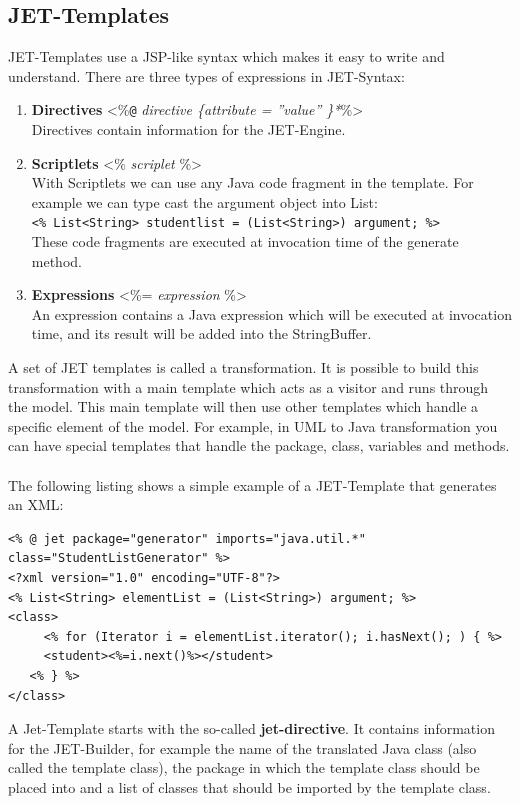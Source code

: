 \subsection{JET-Templates}
JET-Templates use a JSP-like syntax which makes it easy to write and understand. There are three types of expressions in JET-Syntax:
\begin{enumerate}
	\item \textbf{Directives} <\%\verb|@| \textit{directive \{attribute =  ''value''  \}*}\%>\\
	      Directives contain information for the JET-Engine. 
	      
	\item \textbf{Scriptlets} <\% \textit{scriplet} \%>\\
	      With Scriptlets we can use any Java code fragment in the template. 
	      For example we can type cast the argument object into List:\\ 
	      \verb|<% List<String> studentlist = (List<String>) argument; %>|\\
	      These code fragments are executed at invocation time of the generate method.
	      
	\item \textbf{Expressions} <\%= \textit{expression} \%>\\
	      An expression contains a Java expression which will be executed at invocation time, and its result will be added into the StringBuffer.
\end{enumerate}

A set of JET templates is called a transformation. It is possible to build this transformation with a main template which acts as a visitor and runs through the model. This main template will then use other templates which handle a specific element of the model. For example, in UML to Java transformation you can have special templates that handle the package, class, variables and methods.\\\\
The following listing shows a simple example of a JET-Template that generates an XML:
\begin{lstlisting}[caption = A Simple JET-Template]
<% @ jet package="generator" imports="java.util.*" class="StudentListGenerator" %> 
<?xml version="1.0" encoding="UTF-8"?>
<% List<String> elementList = (List<String>) argument; %>
<class>
	 <% for (Iterator i = elementList.iterator(); i.hasNext(); ) { %>
     <student><%=i.next()%></student>
   <% } %>
</class>
\end{lstlisting}
A Jet-Template starts with the so-called \textbf{jet-directive}. It contains information for the JET-Builder, for example the name of the translated Java class (also called the template class), the package in which the template class should be placed into and a list of classes that should be imported by the template class.

